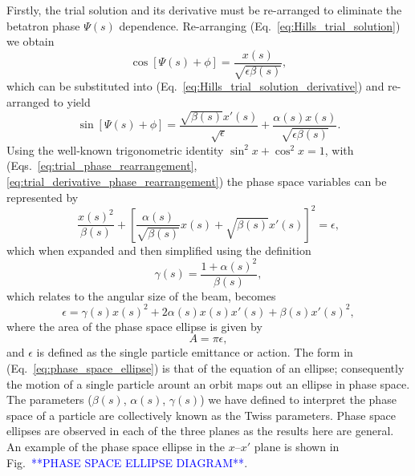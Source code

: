 \documentclass[../main.tex]{subfiles}
\begin{document}
Firstly, the trial solution and its derivative must be re-arranged to eliminate the betatron phase $\Psi\left(s\right)$ dependence. Re-arranging (Eq.~\ref{eq:Hills_trial_solution}) we obtain
\begin{equation}
\cos\left[\Psi\left(s\right)+\phi\right] = \frac{x\left(s\right)}{\sqrt{\epsilon\beta\left(s\right)}},
\label{eq:trial_phase_rearrangement}    
\end{equation}
which can be substituted into (Eq.~\ref{eq:Hills_trial_solution_derivative}) and re-arranged to yield
\begin{equation}
\sin\left[\Psi\left(s\right)+\phi\right] = \frac{\sqrt{\beta\left(s\right)}x'\left(s\right)}{\sqrt{\epsilon}} + \frac{\alpha\left(s\right)x\left(s\right)}{\sqrt{\epsilon\beta\left(s\right)}}.
\label{eq:trial_derivative_phase_rearrangement}    
\end{equation}
Using the well-known trigonometric identity $\sin^{2}x+\cos^{2}x=1$, with (Eqs.~\ref{eq:trial_phase_rearrangement}, \ref{eq:trial_derivative_phase_rearrangement}) the phase space variables can be represented by
\begin{equation}
\frac{x\left(s\right)^{2}}{\beta\left(s\right)}+\left[\frac{\alpha\left(s\right)}{\sqrt{\beta\left(s\right)}}x\left(s\right)+\sqrt{\beta\left(s\right)}x'\left(s\right)\right]^{2} = \epsilon,    
\label{eq:phase_space_trigonometry}
\end{equation}
which when expanded and then simplified using the definition
\begin{equation}
\gamma\left(s\right) = \frac{1+\alpha\left(s\right)^{2}}{\beta\left(s\right)},
\label{eq:gamma_twiss}    
\end{equation}
which relates to the angular size of the beam, becomes
\begin{equation}
\epsilon = \gamma\left(s\right)x\left(s\right)^{2}+2\alpha\left(s\right)x\left(s\right)x'\left(s\right)+\beta\left(s\right)x'\left(s\right)^{2},
\label{eq:phase_space_ellipse}    
\end{equation}
where the area of the phase space ellipse is given by
\begin{equation}
A=\pi\epsilon,
\label{eq:phase_space_area}    
\end{equation} 
and $\epsilon$ is defined as the single particle emittance or action. The form in (Eq.~\ref{eq:phase_space_ellipse}) is that of the equation of an ellipse; consequently the motion of a single particle arount an orbit maps out an ellipse in phase space. The parameters ($\beta\left(s\right)$, $\alpha\left(s\right)$, $\gamma\left(s\right)$) we have defined to interpret the phase space of a particle are collectively known as the Twiss parameters. Phase space ellipses are observed in each of the three planes as the results here are general. An example of the phase space ellipse in the $x$--$x'$ plane is shown in Fig.~\textcolor{blue}{**PHASE SPACE ELLIPSE DIAGRAM**}.
\end{document}
